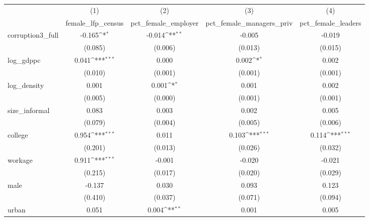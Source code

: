 {
\def\sym#1{\ifmmode^{#1}\else\(^{#1}\)\fi}
\begin{tabular}{l*{4}{c}}
\hline\hline
            &\multicolumn{1}{c}{(1)}&\multicolumn{1}{c}{(2)}&\multicolumn{1}{c}{(3)}&\multicolumn{1}{c}{(4)}\\
            &\multicolumn{1}{c}{female\_lfp\_census}&\multicolumn{1}{c}{pct\_female\_employer}&\multicolumn{1}{c}{pct\_female\_managers\_priv}&\multicolumn{1}{c}{pct\_female\_leaders}\\
\hline
corruption3\_full&      -0.165\sym{*}  &      -0.014\sym{**} &      -0.005         &      -0.019         \\
            &     (0.085)         &     (0.006)         &     (0.013)         &     (0.015)         \\
[1em]
log\_gdppc   &       0.041\sym{***}&       0.000         &       0.002\sym{*}  &       0.002         \\
            &     (0.010)         &     (0.001)         &     (0.001)         &     (0.001)         \\
[1em]
log\_density &       0.001         &       0.001\sym{*}  &       0.001         &       0.002         \\
            &     (0.005)         &     (0.000)         &     (0.001)         &     (0.001)         \\
[1em]
size\_informal&       0.083         &       0.003         &       0.002         &       0.005         \\
            &     (0.079)         &     (0.004)         &     (0.005)         &     (0.006)         \\
[1em]
college     &       0.954\sym{***}&       0.011         &       0.103\sym{***}&       0.114\sym{***}\\
            &     (0.201)         &     (0.013)         &     (0.026)         &     (0.032)         \\
[1em]
workage     &       0.911\sym{***}&      -0.001         &      -0.020         &      -0.021         \\
            &     (0.215)         &     (0.017)         &     (0.020)         &     (0.029)         \\
[1em]
male        &      -0.137         &       0.030         &       0.093         &       0.123         \\
            &     (0.410)         &     (0.037)         &     (0.071)         &     (0.094)         \\
[1em]
urban       &       0.051         &       0.004\sym{**} &       0.001         &       0.005         \\

\end{tabular}}
